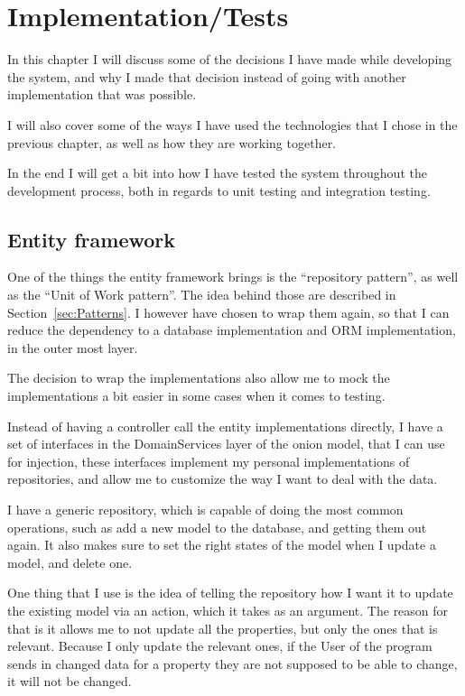 \chapter{Implementation/Tests}
\label{chap:Implementation}

In this chapter I will discuss some of the decisions I have made while
developing the system, and why I made that decision instead of going with
another implementation that was possible.

I will also cover some of the ways I have used the technologies that I chose in
the previous chapter, as well as how they are working together.

In the end I will get a bit into how I have tested the system throughout the
development process, both in regards to unit testing and integration testing.

\section{Entity framework}
\label{sec:Entity framework}
One of the things the entity framework brings is the ``repository pattern'', as
well as the ``Unit of Work pattern''. The idea behind those are described in
Section~\ref{sec:Patterns}. I however have chosen to wrap them again, so that I
can reduce the dependency to a database implementation and ORM implementation,
in the outer most layer. 

The decision to wrap the implementations also allow me to mock the
implementations a bit easier in some cases when it comes to testing. 

Instead of having a controller call the entity implementations directly, I have
a set of interfaces in the DomainServices layer of the onion model, that I can
use for injection, these interfaces implement my personal implementations of
repositories, and allow me to customize the way I want to deal with the data. 

I have a generic repository, which is capable of doing the most common
operations, such as add a new model to the database, and getting them out again.
It also makes sure to set the right states of the model when I update a model,
and delete one. 

One thing that I use is the idea of telling the repository how I want it to
update the existing model via an action, which it takes as an argument. The
reason for that is it allows me to not update all the properties, but only the
ones that is relevant. Because I only update the relevant ones, if the User of
the program sends in changed data for a property they are not supposed to be
able to change, it will not be changed. 

